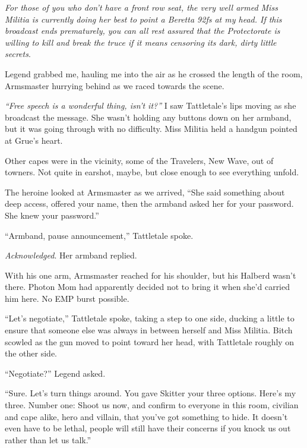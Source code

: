 \emph{For those of you who don't have a front row seat, the very well armed Miss Militia is currently doing her best to point a Beretta 92fs at my head.  If this broadcast ends prematurely, you can all rest assured that the Protectorate is willing to kill and break the truce if it means censoring its dark, dirty little secrets}.



Legend grabbed me, hauling me into the air as he crossed the length of the room, Armsmaster hurrying behind as we raced towards the scene.



\emph{``Free speech is a wonderful thing, isn't it?''} I saw Tattletale's lips moving as she broadcast the message.  She wasn't holding any buttons down on her armband, but it was going through with no difficulty.  Miss Militia held a handgun pointed at Grue's heart.



Other capes were in the vicinity, some of the Travelers, New Wave, out of towners.  Not quite in earshot, maybe, but close enough to see everything unfold.



The heroine looked at Armsmaster as we arrived, ``She said something about deep access, offered your name, then the armband asked her for your password.  She knew your password.''



``Armband, pause announcement,'' Tattletale spoke.



\emph{Acknowledged}.  Her armband replied.



With his one arm, Armsmaster reached for his shoulder, but his Halberd wasn't there.  Photon Mom had apparently decided not to bring it when she'd carried him here.  No EMP burst possible.



``Let's negotiate,'' Tattletale spoke, taking a step to one side, ducking a little to ensure that someone else was always in between herself and Miss Militia.  Bitch scowled as the gun moved to point toward her head, with Tattletale roughly on the other side.



``Negotiate?'' Legend asked.



``Sure.  Let's turn things around.  You gave Skitter your three options.  Here's my three.  Number one: Shoot us now, and confirm to everyone in this room, civilian and cape alike, hero and villain, that you've got something to hide.  It doesn't even have to be lethal, people will still have their concerns if you knock us out rather than let us talk.''




